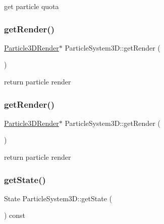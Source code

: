 get particle quota \mbox{\label{classParticleSystem3D_a7ca1509df2a6890b503dc54dfa08a2b4}} 
\subsubsection{\texorpdfstring{get\+Render()}{getRender()}\hspace{0.1cm}{\footnotesize\ttfamily [1/2]}}
{\footnotesize\ttfamily \hyperlink{classParticle3DRender}{Particle3\+D\+Render}$\ast$ Particle\+System3\+D\+::get\+Render (\begin{DoxyParamCaption}{ }\end{DoxyParamCaption})\hspace{0.3cm}{\ttfamily [inline]}}

return particle render \mbox{\label{classParticleSystem3D_a7ca1509df2a6890b503dc54dfa08a2b4}} 
\subsubsection{\texorpdfstring{get\+Render()}{getRender()}\hspace{0.1cm}{\footnotesize\ttfamily [2/2]}}
{\footnotesize\ttfamily \hyperlink{classParticle3DRender}{Particle3\+D\+Render}$\ast$ Particle\+System3\+D\+::get\+Render (\begin{DoxyParamCaption}{ }\end{DoxyParamCaption})\hspace{0.3cm}{\ttfamily [inline]}}

return particle render \mbox{\label{classParticleSystem3D_a01944e27032c4afa6f115b69a0d359ed}} 
\subsubsection{\texorpdfstring{get\+State()}{getState()}\hspace{0.1cm}{\footnotesize\ttfamily [1/2]}}
{\footnotesize\ttfamily State Particle\+System3\+D\+::get\+State (\begin{DoxyParamCaption}{ }\end{DoxyParamCaption}) const\hspace{0.3cm}{\ttfamily [inline]}}

